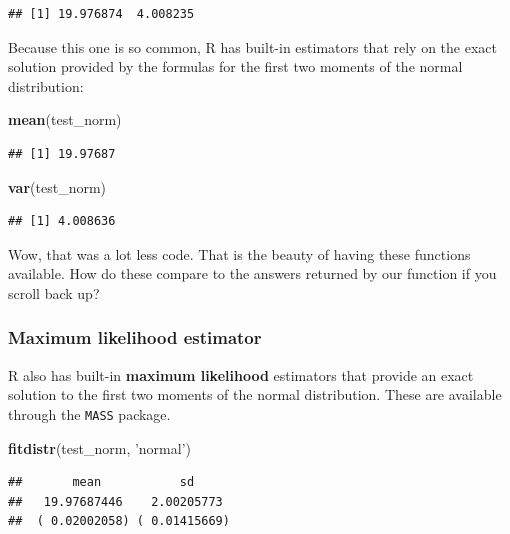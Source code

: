 \documentclass[
]{book}
\newenvironment{Shaded}{\begin{snugshade}}{\end{snugshade}}
\newcommand{\KeywordTok}[1]{\textcolor[rgb]{0.13,0.29,0.53}{\textbf{#1}}}
\newcommand{\NormalTok}[1]{#1}
\newcommand{\StringTok}[1]{\textcolor[rgb]{0.31,0.60,0.02}{#1}}
\begin{document}
\begin{verbatim}
## [1] 19.976874  4.008235
\end{verbatim}

Because this one is so common, R has built-in estimators that rely on
the exact solution provided by the formulas for the first two moments
of the normal distribution:

\begin{Shaded}
\begin{Highlighting}[]
\KeywordTok{mean}\NormalTok{(test_norm)}
\end{Highlighting}
\end{Shaded}

\begin{verbatim}
## [1] 19.97687
\end{verbatim}

\begin{Shaded}
\begin{Highlighting}[]
\KeywordTok{var}\NormalTok{(test_norm)}
\end{Highlighting}
\end{Shaded}

\begin{verbatim}
## [1] 4.008636
\end{verbatim}

Wow, that was a lot less code. That is the beauty of having these functions available. How do these compare to the answers returned by our function if you scroll back up?

\hypertarget{maximum-likelihood-estimator}{%
\subsubsection{Maximum likelihood estimator}\label{maximum-likelihood-estimator}}

R also has built-in \textbf{maximum likelihood} estimators that provide an exact solution to the first two moments of the normal distribution. These are available through the \texttt{MASS} package.

\begin{Shaded}
\begin{Highlighting}[]
\KeywordTok{fitdistr}\NormalTok{(test_norm, }\StringTok{'normal'}\NormalTok{)}
\end{Highlighting}
\end{Shaded}

\begin{verbatim}
##       mean           sd     
##   19.97687446    2.00205773 
##  ( 0.02002058) ( 0.01415669)
\end{verbatim}
\end{document}
